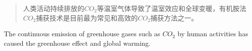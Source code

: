 \begin{abstract}
人类活动持续排放的$CO_2$等温室气体导致了温室效应和全球变暖，有机胺法$CO_2$捕获技术是目前最为常见和高效的$CO_2$捕获方法之一。
\end{abstract}

\begin{enabstract}
The continuous emission of greenhouse gases such as $CO_2$ by human activities has caused the greenhouse effect and global warming.
\end{enabstract}